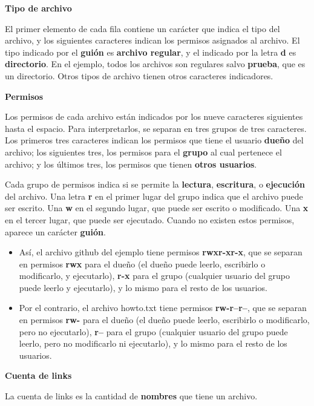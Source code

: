 \documentclass[spanish,A4,]{article}
\begin{document}
\textbf{Tipo de archivo}

El primer elemento de cada fila contiene un carácter que indica el tipo
del archivo, y los siguientes caracteres indican los permisos asignados
al archivo. El tipo indicado por el \textbf{guión} es \textbf{archivo
regular}, y el indicado por la letra \textbf{d} es \textbf{directorio}.
En el ejemplo, todos los archivos son regulares salvo \textbf{prueba},
que es un directorio. Otros tipos de archivo tienen otros caracteres
indicadores.

\textbf{Permisos}

Los permisos de cada archivo están indicados por los nueve caracteres
siguientes hasta el espacio. Para interpretarlos, se separan en tres
grupos de tres caracteres. Los primeros tres caracteres indican los
permisos que tiene el usuario \textbf{dueño} del archivo; los siguientes
tres, los permisos para el \textbf{grupo} al cual pertenece el archivo;
y los últimos tres, los permisos que tienen \textbf{otros usuarios}.

Cada grupo de permisos indica si se permite la \textbf{lectura},
\textbf{escritura}, o \textbf{ejecución} del archivo. Una letra
\textbf{r} en el primer lugar del grupo indica que el archivo puede ser
escrito. Una \textbf{w} en el segundo lugar, que puede ser escrito o
modificado. Una \textbf{x} en el tercer lugar, que puede ser ejecutado.
Cuando no existen estos permisos, aparece un carácter \textbf{guión}.

\begin{itemize}
\itemsep1pt\parskip0pt
\item
  Así, el archivo github del ejemplo tiene permisos \textbf{rwxr-xr-x},
  que se separan en permisos \textbf{rwx} para el dueño (el dueño puede
  leerlo, escribirlo o modificarlo, y ejecutarlo), \textbf{r-x} para el
  grupo (cualquier usuario del grupo puede leerlo y ejecutarlo), y lo
  mismo para el resto de los usuarios.
\item
  Por el contrario, el archivo howto.txt tiene permisos
  \textbf{rw-r--r--}, que se separan en permisos \textbf{rw-} para el
  dueño (el dueño puede leerlo, escribirlo o modificarlo, pero no
  ejecutarlo), \textbf{r--} para el grupo (cualquier usuario del grupo
  puede leerlo, pero no modificarlo ni ejecutarlo), y lo mismo para el
  resto de los usuarios.
\end{itemize}

\textbf{Cuenta de links}

La cuenta de links es la cantidad de \textbf{nombres} que tiene un
archivo.
\end{document}
